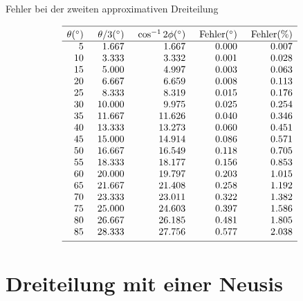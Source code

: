 \begin{table}[t]
\caption{Fehler bei der zweiten approximativen Dreiteilung}\label{t.trisect-second-approx}
\[
%
\begin{array}{r@{\hspace{5mm}}r@{\hspace{5mm}}r@{\hspace{5mm}}r@{\hspace{5mm}}r}
\hline
\noalign{\smallskip}
\theta ({}^\circ) & \theta/3 ({}^\circ)& \cos^{-1} 2\phi ({}^\circ) & \mathrm{Fehler} ({}^\circ) & \mathrm{Fehler (\%)}\\
\hline
  5 &    1.667 &    1.667  &     0.000 &    0.007 \\
 10 &    3.333 &    3.332  &     0.001 &    0.028 \\
 15 &    5.000 &    4.997  &     0.003 &    0.063 \\
 20 &    6.667 &    6.659  &     0.008 &    0.113 \\
 25 &    8.333 &    8.319  &     0.015 &    0.176 \\
 30 &   10.000 &    9.975  &     0.025 &    0.254 \\
 35 &   11.667 &   11.626  &     0.040 &    0.346 \\
 40 &   13.333 &   13.273  &     0.060 &    0.451 \\
 45 &   15.000 &   14.914  &     0.086 &    0.571 \\
 50 &   16.667 &   16.549  &     0.118 &    0.705 \\
 55 &   18.333 &   18.177  &     0.156 &    0.853 \\
 60 &   20.000 &   19.797  &     0.203 &    1.015 \\
 65 &   21.667 &   21.408  &     0.258 &    1.192 \\
 70 &   23.333 &   23.011  &     0.322 &    1.382 \\
 75 &   25.000 &   24.603  &     0.397 &    1.586 \\
 80 &   26.667 &   26.185  &     0.481 &    1.805 \\
 85 &   28.333 &   27.756  &     0.577 &    2.038 \\
 \noalign{\smallskip}
 \hline
 \end{array}
\]
\end{table}


\section{Dreiteilung mit einer Neusis}\label{s.neusis}


